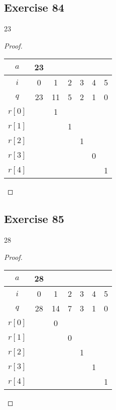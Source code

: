 \documentclass[14pt]{extarticle}
\begin{document}
\subsection{Exercise 84}
23
\begin{proof}
    \begin{center}
        \begin{tabular}{|c|c|c|c|c|c|c|}
            \hline
            $a$    & 23 &    &   &   &   &   \\
            \hline
            $i$    & 0  & 1  & 2 & 3 & 4 & 5 \\
            \hline
            $q$    & 23 & 11 & 5 & 2 & 1 & 0 \\
            \hline
            $r[0]$ &    & 1  &   &   &   &   \\
            \hline
            $r[1]$ &    &    & 1 &   &   &   \\
            \hline
            $r[2]$ &    &    &   & 1 &   &   \\
            \hline
            $r[3]$ &    &    &   &   & 0 &   \\
            \hline
            $r[4]$ &    &    &   &   &   & 1 \\
            \hline
        \end{tabular}
    \end{center}
\end{proof}

\subsection{Exercise 85}
28

\begin{proof}
    \begin{center}
        \begin{tabular}{|c|c|c|c|c|c|c|}
            \hline
            $a$    & 28 &    &   &   &   &   \\
            \hline
            $i$    & 0  & 1  & 2 & 3 & 4 & 5 \\
            \hline
            $q$    & 28 & 14 & 7 & 3 & 1 & 0 \\
            \hline
            $r[0]$ &    & 0  &   &   &   &   \\
            \hline
            $r[1]$ &    &    & 0 &   &   &   \\
            \hline
            $r[2]$ &    &    &   & 1 &   &   \\
            \hline
            $r[3]$ &    &    &   &   & 1 &   \\
            \hline
            $r[4]$ &    &    &   &   &   & 1 \\
            \hline
        \end{tabular}
    \end{center}
\end{proof}
\end{document}
